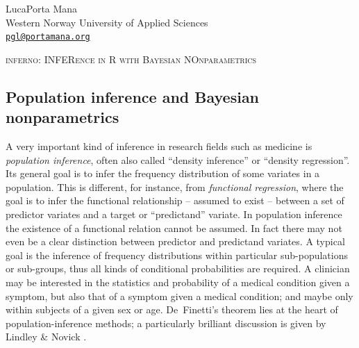 
\newcommand{\citebi}{\cite}
\newcommand{\citein}{\cite}
\newcommand*{\subtitleproc}[1]{}
\newcommand*{\chapb}{}
\providecommand{\doi}[1]{}
\renewcommand{\doi}[1]{\href{https://doi.org/#1}{doi:#1}}
\newcommand*{\osfdoi}[1]{Open Science Framework \doi{#1}}
\newcommand*{\arxivdoi}[1]{arXiv \doi{#1}}
\newcommand*{\amp}{\&}
\renewcommand*{\P}{\mathrm{P}}%
\renewcommand*{\|}[1][]{\nonscript\:#1\vert\nonscript\:\mathopen{}}
\newcommand*{\mo}[1][=]{\mathclose{}\mathord{\nonscript\mkern0.5mu#1\nonscript\mkern0.5mu}\mathopen{}}
\newcommand*{\yF}{F}
\newcommand*{\yf}{f}
\newcommand*{\di}{\mathop{}\!\mathrm{d}}
\newcommand*{\HV}{\mathit{HV}}
\newcommand*{\GDS}{\mathit{GDS}}
\newcommand*{\cAD}{\mathit{cAD}}
\newcommand*{\yy}{\mathrm{Y}}
\newcommand*{\yn}{\mathrm{N}}


\begin{center}
  {\large Luca\enspace Porta Mana} \\
  Western Norway University of Applied Sciences\\
{\tt \href{mailto:pgl@portamana.org}{pgl@portamana.org}}


\Large
\textsc{inferno: INFERence in R with Bayesian NOnparametrics}
\end{center}

\subsection*{Population inference and Bayesian nonparametrics}
\label{sec:popinference}

A very important kind of inference in research fields such as medicine is \emph{population inference}, often also called ``density inference'' or ``density regression''. Its general goal is to infer the frequency distribution of some variates in a population. This is different, for instance, from \emph{functional regression}, where the goal is to infer the functional relationship -- assumed to exist -- between a set of predictor variates and a target or ``predictand'' variate. In population inference the existence of a functional relation cannot be assumed. In fact there may not even be a clear distinction between predictor and predictand variates. A typical goal is the inference of frequency distributions within particular sub-populations or sub-groups, thus all kinds of conditional probabilities are required. A clinician may be interested in the statistics and probability of a medical condition given a symptom, but also that of a symptom given a medical condition; and maybe only within subjects of a given sex or age. De~Finetti's theorem \citep[see e.g.][\S\S\,4.2, 4.3, 4.6]{bernardoetal1994_r2000} lies at the heart of population-inference methods; a particularly brilliant discussion is given by Lindley \& Novick \citeyearpar{lindleyetal1981}.

